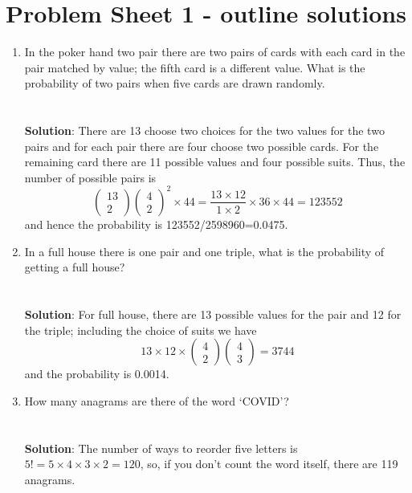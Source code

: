 \documentclass[11pt,a4paper]{scrartcl}
\begin{document}
\section*{Problem Sheet 1 - outline solutions}

\begin{enumerate}

\item In the poker hand two pair there are two pairs of cards with
  each card in the pair matched by value; the fifth card is a
  different value. What is the probability of two pairs when five
  cards are drawn randomly.\\ \\ \\ \textbf{Solution}: There are 13 choose two choices
  for the two values for the two pairs and for each pair there are
  four choose two possible cards. For the remaining card there are 11
  possible values and four possible suits. Thus, the number of
  possible pairs is
\begin{equation}
\left(\begin{array}{c}13\\2\end{array}\right)\left(\begin{array}{c}4\\2\end{array}\right)^2\times 44
=
\frac{13\times 12}{1\times 2}\times 36\times 44=123552
\end{equation}
and hence the probability is 123552/2598960=0.0475.

\item In a full house there is one pair and one
  triple, what is the probability of getting a full
  house?\\ \\ \\ \textbf{Solution}: For full house,
there are 13 possible values for the pair and 12 for the triple; including the choice of suits we have
\begin{equation}
13\times 12 \times \left(\begin{array}{c}4\\2\end{array}\right)\left(\begin{array}{c}4\\3\end{array}\right)=3744
\end{equation}
and the probability is 0.0014.


\item How many anagrams are there of the word `COVID'?\\ \\ \\
  \textbf{Solution}: The number of ways to reorder five letters is $5!=5\times 4\times 3\times 2=120$, so, if you don't count the word itself, there are 119 anagrams.



\end{enumerate}
\end{document}
